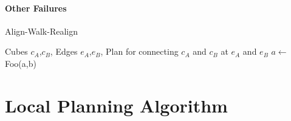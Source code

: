 \paragraph{Other Failures}


\begin{algorithm}
	\caption{Align-Walk-Realign}
	\label{alg:local_algo}
	\begin{algorithmic}
		\REQUIRE Cubes $c_A$,$c_B$, Edges $e_A$,$e_B$, 
		\ENSURE Plan for connecting $c_A$ and $c_B$ at $e_A$ and $e_B$
		\STATE $a \gets$ Foo(a,b)
	\end{algorithmic}
\end{algorithm}

\section{Local Planning Algorithm}
\label{sec:local_algo}